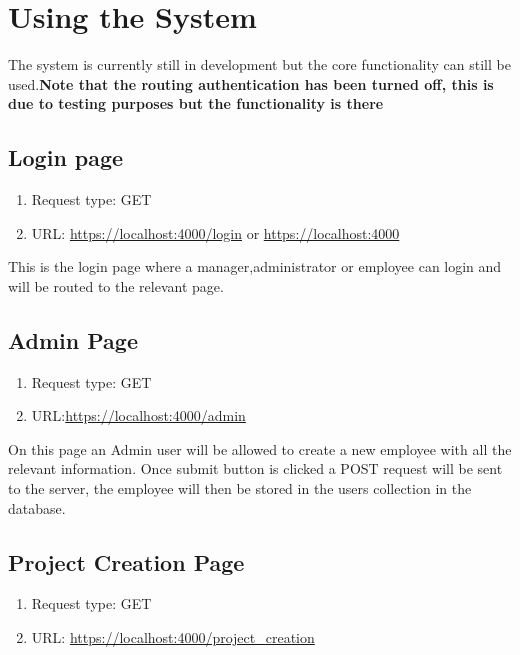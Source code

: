 \documentclass[a4paper,12pt]{article}
\begin{document}
\section{Using the System}
The system is currently still in development but the core functionality can still be used.\textbf{Note that the routing authentication has been turned off, this is due to testing purposes but the functionality is there}

	\subsection{Login page}
	\begin{enumerate}
		\item Request type: GET
		\item URL: \url{https://localhost:4000/login} or \url{https://localhost:4000}
	\end{enumerate}

	\begin{flushleft}
			This is the login page where a manager,administrator or employee can login and will be routed to the relevant page.
	\end{flushleft}

 	\subsection{Admin Page}
 		\begin{enumerate}
 		\item Request type: GET
 		\item URL:\url{https://localhost:4000/admin} 
 	\end{enumerate}
 	\begin{flushleft}
 		On this page an Admin user will be allowed to create a new employee with all the relevant information. Once submit button is clicked a POST request will be sent to the server, the employee will then be stored in the users collection in the database. 
 	\end{flushleft}
 
 \subsection{Project Creation Page}
 		\begin{enumerate}
 	\item Request type: GET
 	\item URL: \url{https://localhost:4000/project_creation}
 \end{enumerate}
\end{document}
